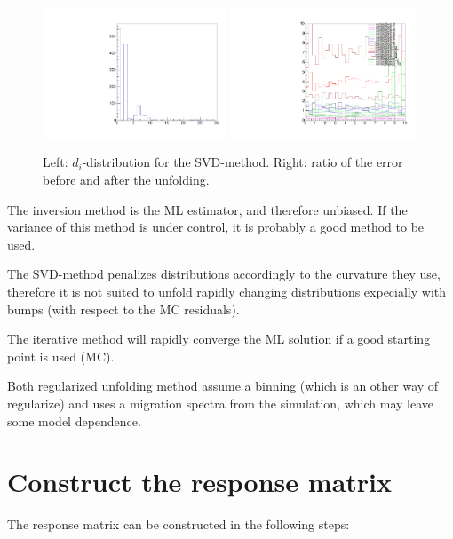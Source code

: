 \documentclass[a4paper,11pt]{article}
\begin{document}
\begin{figure}[H]
	\centering
	\includegraphics[width=0.49\textwidth]{figs/unfold-svd-ddistr.pdf}
	\includegraphics[width=0.49\textwidth]{figs/unfold-error-reg.pdf}
	\caption{ \label{fig:sol:reg2} Left: $d_i$-distribution for the \gls{SVD}-method. Right: ratio of the error before and after the unfolding.}
\end{figure}

The inversion method is the \gls{ML} estimator, and therefore unbiased. If the variance of this method is under control, it is probably a good method to be used. 

The \gls{SVD}-method penalizes distributions accordingly to the curvature they use, therefore it is not suited to unfold rapidly changing distributions expecially with bumps (with respect to the \gls{MC} residuals).

The iterative method will rapidly converge the \gls{ML} solution if a good starting point is used (\gls{MC}). 

Both regularized unfolding method assume a binning (which is an other way of regularize) and uses a migration spectra from the simulation, which may leave some model dependence.

\FloatBarrier
\section{Construct the response matrix}

The response matrix can be constructed in the following steps:
\end{document}
